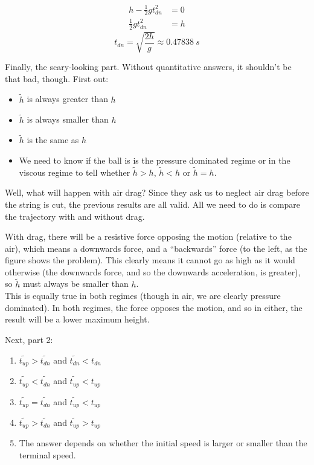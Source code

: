 \documentclass[8.01x]{subfiles}
\begin{document}
\begin{align}
h - \frac{1}{2} g t_{dn}^2 &= 0\\
\frac{1}{2} g t_{dn}^2 &= h
\end{align}
\begin{equation}
t_{dn} = \sqrt{\frac{2 h}{g}} \approx \SI{0.47838}{s}
\end{equation}

Finally, the scary-looking part. Without quantitative answers, it shouldn't be that bad, though.
First out:

\begin{itemize}
\item $\widetilde{h}$ is always greater than $h$
\item $\widetilde{h}$ is always smaller than $h$
\item $\widetilde{h}$ is the same as $h$
\item We need to know if the ball is is the pressure dominated regime or in the viscous regime to tell whether $\widetilde{h} > h$, $\widetilde{h} < h$ or $\widetilde{h} = h$.
\end{itemize}

Well, what will happen with air drag? Since they ask us to neglect air drag before the string is cut, the previous results are all valid. All we need to do is compare the trajectory with and without drag.

With drag, there will be a resistive force opposing the motion (relative to the  air), which means a downwards force, and a ``backwards'' force (to the left, as the figure shows the problem). This clearly means it cannot go as high as it would otherwise (the downwards force, and so the downwards acceleration, is greater), so $\widetilde{h}$ must always be smaller than $h$.\\
This is equally true in both regimes (though in air, we are clearly pressure dominated). In both regimes, the force opposes the motion, and so in either, the result will be a lower maximum height.

Next, part 2:

\begin{enumerate}
\item $\widetilde{t_{up}} > \widetilde{t_{dn}}$ and $\widetilde{t_{dn}} < t_{dn}$
\item $\widetilde{t_{up}} < \widetilde{t_{dn}}$ and $\widetilde{t_{up}} < t_{up}$
\item $\widetilde{t_{up}} = \widetilde{t_{dn}}$ and $\widetilde{t_{up}} < t_{up}$
\item $\widetilde{t_{up}} > \widetilde{t_{dn}}$ and $\widetilde{t_{up}} > t_{up}$
\item The answer depends on whether the initial speed is larger or smaller than the terminal speed.
\end{enumerate}
\end{document}
